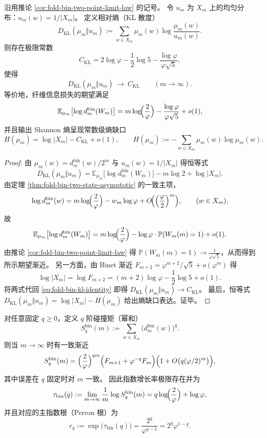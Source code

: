 \begin{proposition}\label{prop:fold-bin-kl-constant}
沿用推论 \ref{cor:fold-bin-two-point-limit-law} 的记号。
令 \(u_m\) 为 \(X_m\) 上的均匀分布：\(u_m(w)=1/|X_m|\)。
定义相对熵（KL 散度）
\[
D_{\mathrm{KL}}(\mu_m\Vert u_m)
:=\sum_{w\in X_m}\mu_m(w)\log\frac{\mu_m(w)}{u_m(w)}.
\]
则存在极限常数
\[
C_{\mathrm{KL}}
=2\log\varphi-\frac12\log 5-\frac{\log\varphi}{\varphi\sqrt5},
\]
使得
\[
D_{\mathrm{KL}}(\mu_m\Vert u_m)\ \longrightarrow\ C_{\mathrm{KL}}
\qquad(m\to\infty).
\]
等价地，纤维信息损失的期望满足
\[
\mathbb{E}_{\mu_m}\bigl[\log d^{\mathrm{bin}}_m(W_m)\bigr]
=m\log\!\Bigl(\frac{2}{\varphi}\Bigr)-\frac{\log\varphi}{\varphi\sqrt5}+o(1),
\]
并且输出 Shannon 熵呈现常数级熵缺口
\[
H(\mu_m)=\log|X_m|-C_{\mathrm{KL}}+o(1),
\qquad
H(\mu_m):=-\sum_{w\in X_m}\mu_m(w)\log \mu_m(w).
\]
\end{proposition}

\begin{proof}
由 \(\mu_m(w)=d^{\mathrm{bin}}_m(w)/2^m\) 与 \(u_m(w)=1/|X_m|\) 得恒等式
\begin{equation}\label{eq:fold-bin-kl-identity}
D_{\mathrm{KL}}(\mu_m\Vert u_m)
=\mathbb{E}_{\mu_m}\bigl[\log d^{\mathrm{bin}}_m(W_m)\bigr]-m\log 2+\log|X_m|.
\end{equation}
由定理 \ref{thm:fold-bin-two-state-asymptotic} 的一致主项，
\[
\log d^{\mathrm{bin}}_m(w)
=m\log\!\Bigl(\frac{2}{\varphi}\Bigr)-w_m\log\varphi+O\!\Bigl(\Bigl(\frac{\varphi}{2}\Bigr)^m\Bigr),
\qquad (w\in X_m),
\]
故
\[
\mathbb{E}_{\mu_m}\bigl[\log d^{\mathrm{bin}}_m(W_m)\bigr]
=m\log\!\Bigl(\frac{2}{\varphi}\Bigr)-\log\varphi\cdot \mathbb{P}(W_m(m)=1)+o(1).
\]
由推论 \ref{cor:fold-bin-two-point-limit-law} 得 \(\mathbb{P}(W_m(m)=1)\to \frac{1}{\varphi\sqrt5}\)，从而得到所示期望渐近。
另一方面，由 Binet 渐近 \(F_{m+2}=\varphi^{m+2}/\sqrt5+o(\varphi^m)\) 得
\[
\log|X_m|=\log F_{m+2}=(m+2)\log\varphi-\frac12\log 5+o(1).
\]
将两式代回 \eqref{eq:fold-bin-kl-identity} 即得 \(D_{\mathrm{KL}}(\mu_m\Vert u_m)\to C_{\mathrm{KL}}\)。
最后，恒等式 \(D_{\mathrm{KL}}(\mu_m\Vert u_m)=\log|X_m|-H(\mu_m)\) 给出熵缺口表达。证毕。
\end{proof}

\begin{proposition}\label{prop:fold-bin-power-sum-asymptotic}
对任意固定 \(q\ge 0\)，定义 \(q\) 阶碰撞矩（幂和）
\[
S_q^{\mathrm{bin}}(m):=\sum_{w\in X_m}\bigl(d^{\mathrm{bin}}_m(w)\bigr)^q.
\]
则当 \(m\to\infty\) 时有一致渐近
\[
S_q^{\mathrm{bin}}(m)=\Bigl(\frac{2}{\varphi}\Bigr)^{qm}\Bigl(F_{m+1}+\varphi^{-q}F_m\Bigr)\Bigl(1+O\bigl(q(\varphi/2)^m\bigr)\Bigr),
\]
其中误差在 \(q\) 固定时对 \(m\) 一致。
因此指数增长率极限存在并为
\[
\tau_{\mathrm{bin}}(q):=\lim_{m\to\infty}\frac{1}{m}\log S_q^{\mathrm{bin}}(m)
=q\log\!\Bigl(\frac{2}{\varphi}\Bigr)+\log\varphi,
\]
并且对应的主指数根（Perron 根）为
\[
r_q:=\exp\bigl(\tau_{\mathrm{bin}}(q)\bigr)=\frac{2^q}{\varphi^{q-1}}=2^q\varphi^{1-q}.
\]
\end{proposition}

